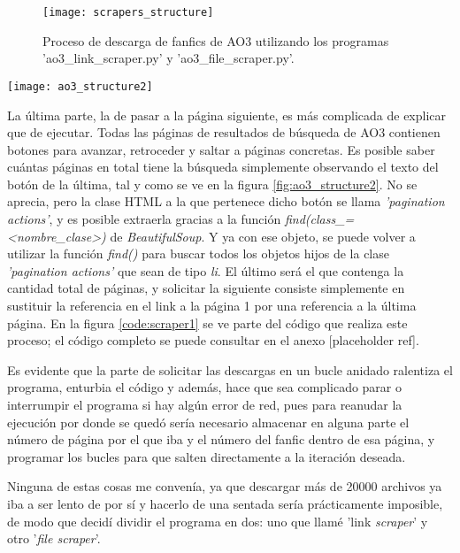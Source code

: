 \documentclass{pre-tfg}
\newcommand{\refToLinkScraperCode}{[placeholder ref]}
\begin{document}
\begin{figure}
	\texttt{[image: scrapers\_structure]}
	\caption{Proceso de descarga de fanfics de AO3 utilizando los programas 'ao3\_link\_scraper.py' y 'ao3\_file\_scraper.py'.}
	\label{fig:scrapers_structure}
	\centering
\end{figure}


\begin{SCfigure}
	\caption{Navegación de páginas de búsqueda de AO3. Todos los botones vienen con su número de página, y se puede ver cuál es la última}
	\label{fig:ao3_structure2}
	\texttt{[image: ao3\_structure2]}
\end{SCfigure}

La última parte, la de pasar a la página siguiente, es más complicada de explicar que de ejecutar. Todas las páginas de resultados de búsqueda de AO3 contienen botones para avanzar, retroceder y saltar a páginas concretas. Es posible saber cuántas páginas en total tiene la búsqueda simplemente observando el texto del botón de la última, tal y como se ve en la figura \ref{fig:ao3_structure2}. No se aprecia, pero la clase HTML a la que pertenece dicho botón se llama \textit{'pagination actions'}, y es posible extraerla gracias a la función \textit{find(class\_=<nombre\_clase>)} de \textit{BeautifulSoup}. Y ya con ese objeto, se puede volver a utilizar la función \textit{find()} para buscar todos los objetos hijos de la clase \textit{'pagination actions'} que sean de tipo \textit{li}. El último será el que contenga la cantidad total de páginas, y solicitar la siguiente consiste simplemente en sustituir la referencia en el link a la página 1 por una referencia a la última página. En la figura \ref{code:scraper1} se ve parte del código que realiza este proceso; el código completo se puede consultar en el anexo \refToLinkScraperCode.

Es evidente que la parte de solicitar las descargas en un bucle anidado ralentiza el programa, enturbia el código y además, hace que sea complicado parar o interrumpir el programa si hay algún error de red, pues para reanudar la ejecución por donde se quedó sería necesario almacenar en alguna parte el número de página por el que iba y el número del fanfic dentro de esa página, y programar los bucles para que salten directamente a la iteración deseada.

Ninguna de estas cosas me convenía, ya que descargar más de 20000 archivos ya iba a ser lento de por sí y hacerlo de una sentada sería prácticamente imposible, de modo que decidí dividir el programa en dos: uno que llamé 'link \textit{scraper}' y otro '\textit{file scraper}'.
\end{document}
